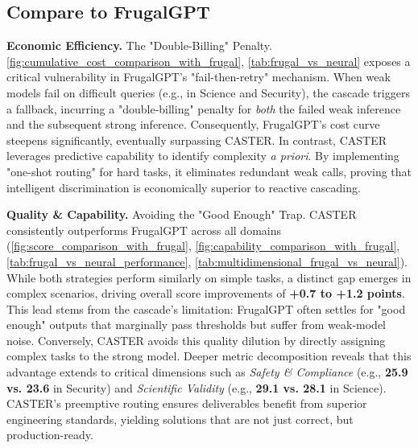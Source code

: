 \documentclass{article}
\theoremstyle{plain}
\theoremstyle{definition}
\theoremstyle{remark}
\begin{document}
\subsection{Compare to FrugalGPT}

\textbf{Economic Efficiency.} The "Double-Billing" Penalty. \cref{fig:cumulative_cost_comparison_with_frugal}, \cref{tab:frugal_vs_neural} exposes a critical vulnerability in FrugalGPT's "fail-then-retry" mechanism. When weak models fail on difficult queries (e.g., in Science and Security), the cascade triggers a fallback, incurring a "double-billing" penalty for \textit{both} the failed weak inference and the subsequent strong inference. Consequently, FrugalGPT's cost curve steepens significantly, eventually surpassing CASTER. In contrast, CASTER leverages predictive capability to identify complexity \textit{a priori}. By implementing "one-shot routing" for hard tasks, it eliminates redundant weak calls, proving that intelligent discrimination is economically superior to reactive cascading.

\textbf{Quality \& Capability.} Avoiding the "Good Enough" Trap. CASTER consistently outperforms FrugalGPT across all domains (\cref{fig:score_comparison_with_frugal}, \cref{fig:capability_comparison_with_frugal}, \cref{tab:frugal_vs_neural_performance}, \cref{tab:multidimensional_frugal_vs_neural}). While both strategies perform similarly on simple tasks, a distinct gap emerges in complex scenarios, driving overall score improvements of \textbf{+0.7 to +1.2 points}. This lead stems from the cascade's limitation: FrugalGPT often settles for "good enough" outputs that marginally pass thresholds but suffer from weak-model noise. Conversely, CASTER avoids this quality dilution by directly assigning complex tasks to the strong model. Deeper metric decomposition reveals that this advantage extends to critical dimensions such as \textit{Safety \& Compliance} (e.g., \textbf{25.9 vs. 23.6} in Security) and \textit{Scientific Validity} (e.g., \textbf{29.1 vs. 28.1} in Science). CASTER's preemptive routing ensures deliverables benefit from superior engineering standards, yielding solutions that are not just correct, but production-ready.
\end{document}
